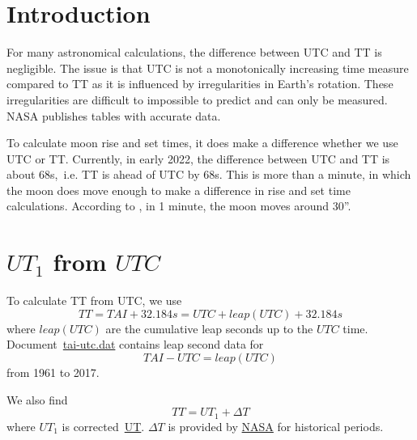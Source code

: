 \documentclass[]{article}
\title{}
\author{Sven Schmidt}
\begin{document}
\maketitle

\begin{abstract}

\end{abstract}

\section{Introduction}

For many astronomical calculations, the difference between UTC and TT is negligible.
The issue is that UTC is not a monotonically increasing time measure compared to TT
as it is influenced by irregularities in Earth's rotation. These irregularities are
difficult to impossible to predict and can only be measured. NASA publishes tables
with accurate data.

To calculate moon rise and set times, it does make a difference whether we use UTC or
TT. Currently, in early 2022, the difference between UTC and TT is about 68s,~i.e.
TT is ahead of UTC by 68s. This is more than a minute, in which the moon does move
enough to make a difference in rise and set time calculations. According to \cite{BOOK:MontenbruckPfleger}, in
1 minute, the moon moves around 30''.


\section{$UT_{1}$ from $UTC$}

To calculate TT from UTC, we use
\begin{equation}
\label{1}
TT = TAI + 32.184s = UTC + leap(UTC) + 32.184s
\end{equation}
where $leap(UTC)$ are the cumulative leap seconds up to the $UTC$ time.
Document~\href{https://cddis.nasa.gov/archive/products/iers/tai-utc.dat}{tai-utc.dat}
contains leap second data for
\begin{equation}
TAI - UTC = leap(UTC)
\end{equation}
from 1961 to 2017.

We also find
\begin{equation}
\label{2}
TT = UT_{1} + \Delta T
\end{equation}
where $UT_{1}$ is corrected~\href{https://stjarnhimlen.se/comp/time.html#deltat}{UT}.
$\Delta T$ is provided by \href{https://cddis.nasa.gov/archive/products/iers/historic_deltat.data}{NASA}
for historical periods.
\end{document}
